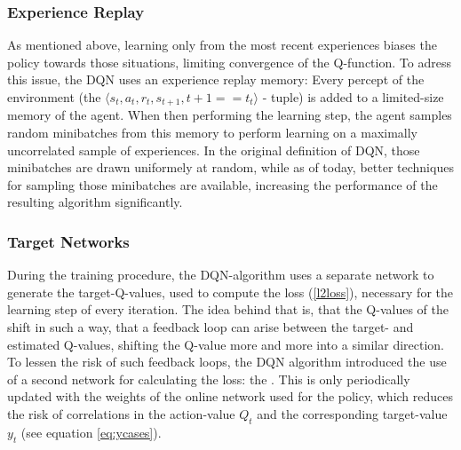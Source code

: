 \subsubsection{Experience Replay}
As mentioned above, learning only from the most recent experiences biases the policy towards those situations, limiting convergence of the Q-function. To adress this issue, the DQN uses an experience replay memory: Every percept of the environment (the $\langle s_t, a_t, r_t, s_{t+1}, t+1==t_t \rangle$ - tuple) is added to a limited-size memory of the agent. When then performing the learning step, the agent samples random minibatches from this memory to perform learning on a maximally uncorrelated sample of experiences. In the original definition of DQN, those minibatches are drawn uniformely at random, while as of today, better techniques for sampling those minibatches are available\cite{schaul_prioritized_2015}, increasing the performance of the resulting algorithm significantly. %

\subsubsection{Target Networks}
During the training procedure, the DQN-algorithm uses a separate network to generate the target-Q-values, used to compute the loss (\ref{l2loss}), necessary for the learning step of every iteration. The idea behind that is, that the Q-values of the  shift in such a way, that a feedback loop can arise between the target- and estimated Q-values, shifting the Q-value more and more into a similar direction. %
To lessen the risk of such feedback loops, the DQN algorithm introduced the use of a second network for calculating the loss: the . This is only periodically updated with the weights of the online network used for the policy, which reduces the risk of correlations in the action-value $Q_t$ and the corresponding target-value $y_t$ (see equation \ref{eq:ycases}).

